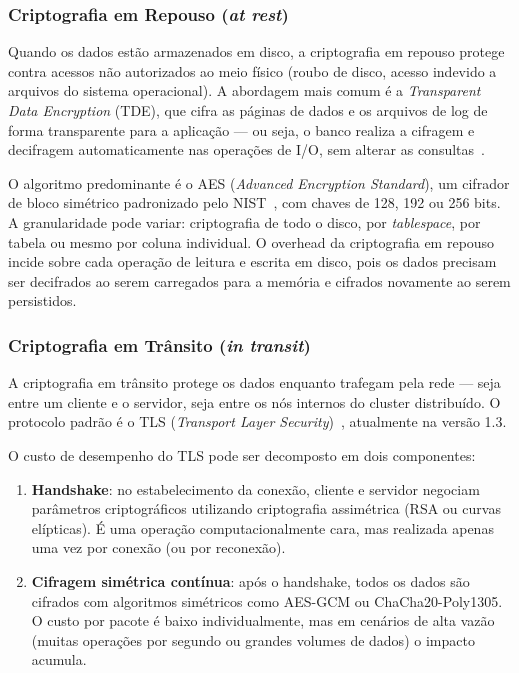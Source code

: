 \documentclass[12pt]{article}
\begin{document}
\subsubsection{Criptografia em Repouso (\emph{at rest})}

Quando os dados estão armazenados em disco, a criptografia em repouso protege
contra acessos não autorizados ao meio físico (roubo de disco, acesso indevido
a arquivos do sistema operacional). A abordagem mais comum é a
\emph{Transparent Data Encryption} (TDE), que cifra as páginas de dados e os
arquivos de log de forma transparente para a aplicação --- ou seja, o banco
realiza a cifragem e decifragem automaticamente nas operações de I/O, sem
alterar as consultas~\cite{nist2020sp80053r5}.

O algoritmo predominante é o AES (\emph{Advanced Encryption Standard}), um
cifrador de bloco simétrico padronizado pelo NIST~\cite{nist2001aes}, com
chaves de 128, 192 ou 256 bits. A granularidade pode variar: criptografia de
todo o disco, por \emph{tablespace}, por tabela ou mesmo por coluna individual.
O overhead da criptografia em repouso incide sobre cada operação de leitura e
escrita em disco, pois os dados precisam ser decifrados ao serem carregados para
a memória e cifrados novamente ao serem persistidos.

\subsubsection{Criptografia em Trânsito (\emph{in transit})}

A criptografia em trânsito protege os dados enquanto trafegam pela rede ---
seja entre um cliente e o servidor, seja entre os nós internos do cluster
distribuído. O protocolo padrão é o TLS (\emph{Transport Layer
Security})~\cite{rescorla2018tls}, atualmente na versão 1.3.

O custo de desempenho do TLS pode ser decomposto em dois componentes:

\begin{enumerate}
  \item \textbf{Handshake}: no estabelecimento da conexão, cliente e servidor
        negociam parâmetros criptográficos utilizando criptografia assimétrica
        (RSA ou curvas elípticas). É uma operação computacionalmente cara, mas
        realizada apenas uma vez por conexão (ou por reconexão).
  \item \textbf{Cifragem simétrica contínua}: após o handshake, todos os dados
        são cifrados com algoritmos simétricos como AES-GCM ou
        ChaCha20-Poly1305. O custo por pacote é baixo individualmente, mas em
        cenários de alta vazão (muitas operações por segundo ou grandes volumes
        de dados) o impacto acumula.
\end{enumerate}
\end{document}
